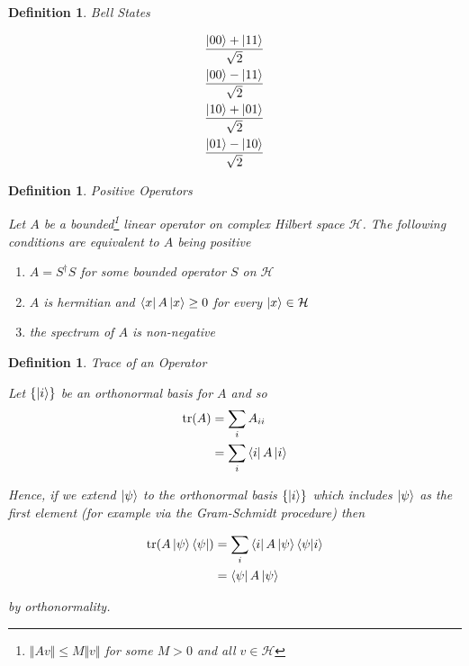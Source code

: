 \documentclass[11pt]{article}
\newcommand\0{\mathbf{0}}
\newcommand\<{\langle}
\renewcommand\>{\rangle}
\newtheorem{definition}[theorem]{Definition}
\begin{document}
\begin{definition}
\label{bellstates}
Bell States

\begin{align*}
\frac{\ket{00} + \ket{11} }{\sqrt{2}} \\	
\frac{\ket{00} - \ket{11} }{\sqrt{2}} \\	
\frac{\ket{10} + \ket{01} }{\sqrt{2}} \\	
\frac{\ket{01} - \ket{10} }{\sqrt{2}}
\end{align*}
\end{definition}

\begin{definition}
\label{posop}
Positive Operators

Let $A$ be a bounded\footnote{$\Vert Av \Vert \leq M\Vert v \Vert$ for some $M>0$ and all $v \in \mathcal{H}$} linear operator on complex Hilbert space $\mathcal{H}$. The following conditions are equivalent to $A$ being positive

\begin{enumerate}
\item $A=S^\dag S$ for some bounded operator $S$ on $\mathcal{H}$
\item $A$ is hermitian and $\bra{x} A \ket{x} \geq 0$ for every $\ket{x} \in \mathcal{H}$
\item the spectrum of $A$ is non-negative
\end{enumerate}
\end{definition}

\begin{definition}
\label{trop}
Trace of an Operator

Let $\{\ket{i}\}$ be an orthonormal basis for $A$ and so
\begin{align*}
\tr(A) &= \sum_i A_{ii} \\
&= \sum_i \bra{i} A \ket{i}	
\end{align*}

Hence, if we extend $\ket{\psi}$ to the orthonormal basis $\{\ket{i}\}$ which includes $\ket{\psi}$ as the first element (for example via the Gram-Schmidt procedure) then

\begin{align*}
	\tr(A\ket{\psi}\bra{\psi}) &= \sum_i \bra{i} A\ket{\psi}\bra{\psi}\ket{i}	 \\
	&= \bra{\psi} A\ket{\psi}
\end{align*}

by orthonormality.
\end{definition}
\end{document}
